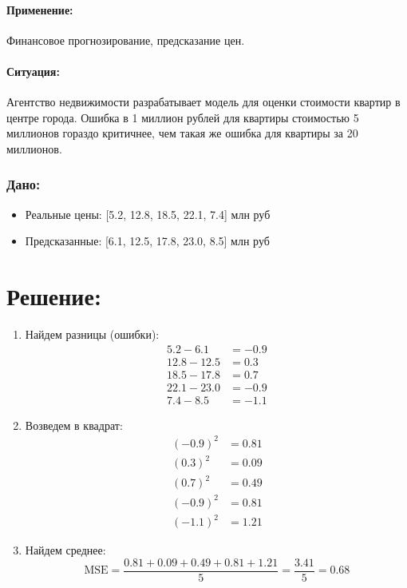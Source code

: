 \paragraph{Применение:} Финансовое прогнозирование, предсказание цен.

\paragraph{Ситуация:} Агентство недвижимости разрабатывает модель для оценки стоимости квартир в центре города. Ошибка в 1 миллион рублей для квартиры стоимостью 5 миллионов гораздо критичнее, чем такая же ошибка для квартиры за 20 миллионов.

\subsubsection*{Дано:}
\begin{itemize}
    \item Реальные цены: [5.2, 12.8, 18.5, 22.1, 7.4] млн руб
    \item Предсказанные: [6.1, 12.5, 17.8, 23.0, 8.5] млн руб
\end{itemize}


\section*{Решение:}

\begin{enumerate}
    \item {Найдем разницы (ошибки):}
    \[
    \begin{aligned}
    5.2 - 6.1 &= -0.9 \\
    12.8 - 12.5 &= 0.3 \\
    18.5 - 17.8 &= 0.7 \\
    22.1 - 23.0 &= -0.9 \\
    7.4 - 8.5 &= -1.1
    \end{aligned}
    \]

    \item {Возведем в квадрат:}
    \[
    \begin{aligned}
    (-0.9)^2 &= 0.81 \\
    (0.3)^2 &= 0.09 \\
    (0.7)^2 &= 0.49 \\
    (-0.9)^2 &= 0.81 \\
    (-1.1)^2 &= 1.21
    \end{aligned}
    \]

    \item {Найдем среднее:}
    \[
    \text{MSE} = \frac{0.81 + 0.09 + 0.49 + 0.81 + 1.21}{5} = \frac{3.41}{5} = 0.68
    \]
\end{enumerate}


